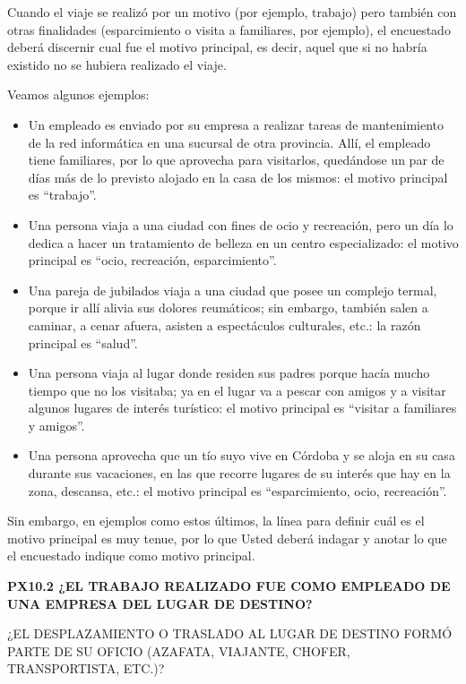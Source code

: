 \documentclass[
  openany]{book}
\begin{document}
Cuando el viaje se realizó por un motivo (por ejemplo, trabajo) pero también con otras finalidades (esparcimiento o visita a familiares, por ejemplo), el encuestado deberá discernir cual fue el motivo principal, es decir, aquel que si no habría existido no se hubiera realizado el viaje.

Veamos algunos ejemplos:

\begin{itemize}
\item
  Un empleado es enviado por su empresa a realizar tareas de mantenimiento de la red informática en una sucursal de otra provincia. Allí, el empleado tiene familiares, por lo que aprovecha para visitarlos, quedándose un par de días más de lo previsto alojado en la casa de los mismos: el motivo principal es ``trabajo''.
\item
  Una persona viaja a una ciudad con fines de ocio y recreación, pero un día lo dedica a hacer un tratamiento de belleza en un centro especializado: el motivo principal es ``ocio, recreación, esparcimiento''.
\item
  Una pareja de jubilados viaja a una ciudad que posee un complejo termal, porque ir allí alivia sus dolores reumáticos; sin embargo, también salen a caminar, a cenar afuera, asisten a espectáculos culturales, etc.: la razón principal es ``salud''.
\item
  Una persona viaja al lugar donde residen sus padres porque hacía mucho tiempo que no los visitaba; ya en el lugar va a pescar con amigos y a visitar algunos lugares de interés turístico: el motivo principal es ``visitar a familiares y amigos''.
\item
  Una persona aprovecha que un tío suyo vive en Córdoba y se aloja en su casa durante sus vacaciones, en las que recorre lugares de su interés que hay en la zona, descansa, etc.: el motivo principal es ``esparcimiento, ocio, recreación''.
\end{itemize}

Sin embargo, en ejemplos como estos últimos, la línea para definir cuál es el motivo principal es muy tenue, por lo que Usted deberá indagar y anotar lo que el encuestado indique como motivo principal.

\textbf{PX10.2 ¿EL TRABAJO REALIZADO FUE COMO EMPLEADO DE UNA EMPRESA DEL LUGAR DE DESTINO?}

¿EL DESPLAZAMIENTO O TRASLADO AL LUGAR DE DESTINO FORMÓ PARTE DE SU OFICIO (AZAFATA, VIAJANTE, CHOFER, TRANSPORTISTA, ETC.)?
\end{document}
